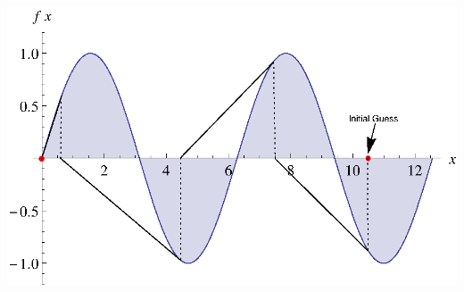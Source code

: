 \documentclass{report}
\begin{document}
\begin{enumerate}
\hspace{6 mm}\includegraphics[scale=.5]{rootskipping.eps}
\end{enumerate}
\end{document}
